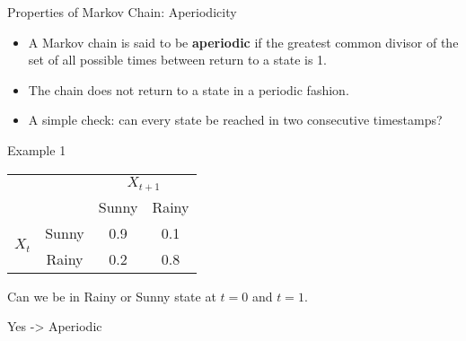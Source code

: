 \documentclass{beamer}
\begin{document}
  \begin{frame}{Properties of Markov Chain: Aperiodicity}
    \begin{itemize}
        \item A Markov chain is said to be \textbf{aperiodic} if the greatest common divisor of the set of all possible times between return to a state is 1.
        \pause \item The chain does not return to a state in a periodic fashion.
        \pause \item A simple check: can every state be reached in two consecutive timestamps?
        
    \end{itemize}
  
    \pause Example 1
  
    
      \begin{tabular}{cccc}
        \small
        \toprule
        & & \multicolumn{2}{c}{\(X_{t+1}\)} \\
        \cmidrule{3-4}
        & & Sunny & Rainy \\
        \midrule
        \multirow{2}{*}{\(X_t\)} & Sunny & 0.9 & 0.1 \\
        & Rainy & 0.2 & 0.8 \\
        \bottomrule
      \end{tabular}
  
  
    \pause Can we be in Rainy or Sunny state at $t=0$ and $t=1$. 
  
    \pause Yes -> Aperiodic
  
  
  
  
  
  
  \end{frame}
\end{document}
